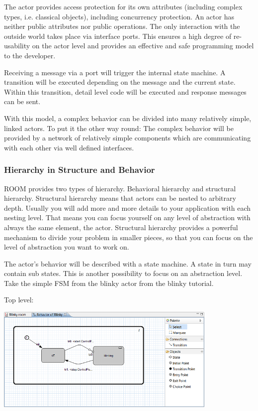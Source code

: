 The actor provides access protection for its own attributes (including complex types, i.e. classical objects), 
including concurrency protection. An actor has neither public attributes nor public operations. The only 
interaction with the outside world takes place via interface ports. This ensures a high degree of 
re-usability on the actor level and provides an effective and safe programming model to the developer. 

Receiving a message via a port will trigger the internal state machine. A transition will be executed 
depending on the message and the current state. Within this transition, detail level code will be executed 
and response messages can be sent.

With this model, a complex behavior can be divided into many relatively simple, linked actors. To put it the 
other way round: The complex behavior will be provided by a network of relatively simple components which 
are communicating with each other via well defined interfaces.


\subsubsection{Hierarchy in Structure and Behavior}

ROOM provides two types of hierarchy. Behavioral hierarchy and structural hierarchy. Structural hierarchy 
means that actors can be nested to arbitrary depth. Usually you will add more and more details to your 
application with each nesting level. That means you can focus yourself on any level of abstraction with 
always the same element, the actor. Structural hierarchy provides a powerful mechanism to divide your 
problem in smaller pieces, so that you can focus on the level of abstraction you want to work on. 

The actor's behavior will be described with a state machine. A state in turn may contain sub states. This 
is another possibility to focus on an abstraction level. Take the simple FSM from the blinky actor from 
the blinky tutorial. 
   
Top level:

\includegraphics[width=0.8\textwidth]{images/020-Blinky15.png}

